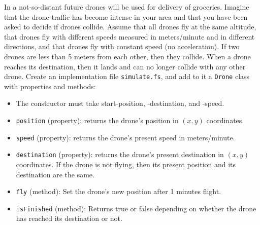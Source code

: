 In a not-so-distant future drones will be used for delivery of
groceries. Imagine that the drone-traffic has become intense in your
area and that you have been asked to decide if drones collide. Assume
that all drones fly at the same altitude, that drones fly with
different speeds measured in meters/minute and in different
directions, and that drones fly with constant speed (no
acceleration). If two drones are less than 5 meters from each other,
then they collide. When a drone reaches its destination, then it lands
and can no longer collide with any other drone. Create an implementation
file \lstinline{simulate.fs}, and add to it a \lstinline{Drone} class
with properties and methods:

\begin{itemize}
\item The constructor must take start-position, -destination, and -speed.
\item \lstinline{position} (property): returns the drone's position in $(x, y)$ coordinates.
\item \lstinline{speed} (property): returns the drone's present speed in meters/minute.
\item \lstinline{destination} (property): returns the drone's present destination in $(x, y)$ coordinates. If the drone is not flying, then its present position and its destination are the same.
\item \lstinline{fly} (method): Set the drone's new position after 1 minutes flight.
\item \lstinline{isFinished} (method): Returns true or false depending on whether the drone has reached its destination or not.
\end{itemize}

